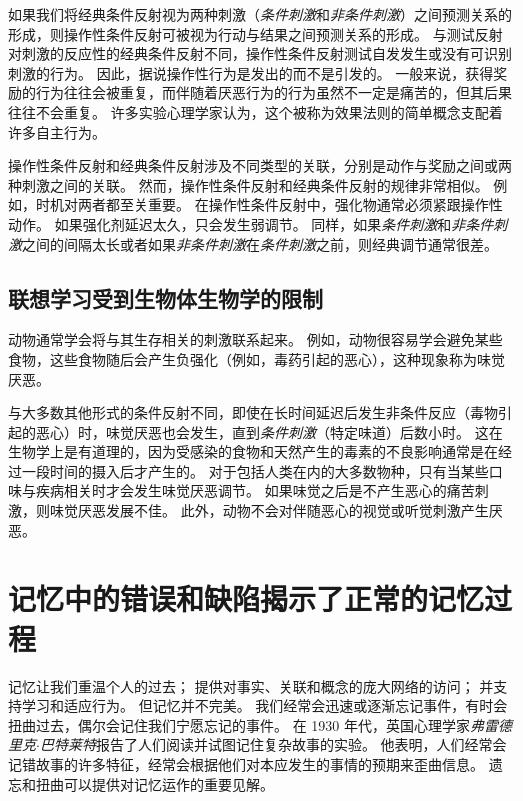 如果我们将经典条件反射视为两种刺激（\textit{条件刺激}和\textit{非条件刺激}）之间预测关系的形成，则操作性条件反射可被视为行动与结果之间预测关系的形成。
与测试反射对刺激的反应性的经典条件反射不同，操作性条件反射测试自发发生或没有可识别刺激的行为。
因此，据说操作性行为是发出的而不是引发的。
一般来说，获得奖励的行为往往会被重复，而伴随着厌恶行为的行为虽然不一定是痛苦的，但其后果往往不会重复。
许多实验心理学家认为，这个被称为效果法则的简单概念支配着许多自主行为。


操作性条件反射和经典条件反射涉及不同类型的关联，分别是动作与奖励之间或两种刺激之间的关联。
然而，操作性条件反射和经典条件反射的规律非常相似。
例如，时机对两者都至关重要。
在操作性条件反射中，强化物通常必须紧跟操作性动作。
如果强化剂延迟太久，只会发生弱调节。
同样，如果\textit{条件刺激}和\textit{非条件刺激}之间的间隔太长或者如果\textit{非条件刺激}在\textit{条件刺激}之前，则经典调节通常很差。



\subsection{联想学习受到生物体生物学的限制}

动物通常学会将与其生存相关的刺激联系起来。
例如，动物很容易学会避免某些食物，这些食物随后会产生负强化（例如，毒药引起的恶心），这种现象称为味觉厌恶。


与大多数其他形式的条件反射不同，即使在长时间延迟后发生非条件反应（毒物引起的恶心）时，味觉厌恶也会发生，直到\textit{条件刺激}（特定味道）后数小时。
这在生物学上是有道理的，因为受感染的食物和天然产生的毒素的不良影响通常是在经过一段时间的摄入后才产生的。
对于包括人类在内的大多数物种，只有当某些口味与疾病相关时才会发生味觉厌恶调节。
如果味觉之后是不产生恶心的痛苦刺激，则味觉厌恶发展不佳。
此外，动物不会对伴随恶心的视觉或听觉刺激产生厌恶。



\section{记忆中的错误和缺陷揭示了正常的记忆过程}

记忆让我们重温个人的过去； 提供对事实、关联和概念的庞大网络的访问； 并支持学习和适应行为。 但记忆并不完美。
我们经常会迅速或逐渐忘记事件，有时会扭曲过去，偶尔会记住我们宁愿忘记的事件。
在 1930 年代，英国心理学家\textit{弗雷德里克$\cdot$巴特莱特}报告了人们阅读并试图记住复杂故事的实验。
他表明，人们经常会记错故事的许多特征，经常会根据他们对本应发生的事情的预期来歪曲信息。
遗忘和扭曲可以提供对记忆运作的重要见解。


